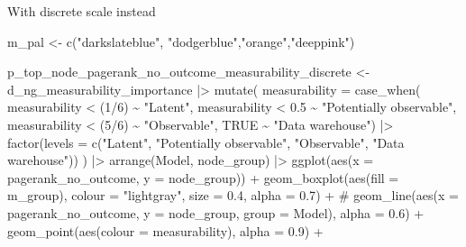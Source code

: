 \documentclass[
  letterpaper,
  DIV=11,
  numbers=noendperiod]{scrartcl}
\newenvironment{Shaded}{\begin{snugshade}}{\end{snugshade}}
\newcommand{\AttributeTok}[1]{\textcolor[rgb]{0.40,0.45,0.13}{#1}}
\newcommand{\CommentTok}[1]{\textcolor[rgb]{0.37,0.37,0.37}{#1}}
\newcommand{\ConstantTok}[1]{\textcolor[rgb]{0.56,0.35,0.01}{#1}}
\newcommand{\DecValTok}[1]{\textcolor[rgb]{0.68,0.00,0.00}{#1}}
\newcommand{\FloatTok}[1]{\textcolor[rgb]{0.68,0.00,0.00}{#1}}
\newcommand{\FunctionTok}[1]{\textcolor[rgb]{0.28,0.35,0.67}{#1}}
\newcommand{\NormalTok}[1]{\textcolor[rgb]{0.00,0.23,0.31}{#1}}
\newcommand{\OtherTok}[1]{\textcolor[rgb]{0.00,0.23,0.31}{#1}}
\newcommand{\SpecialCharTok}[1]{\textcolor[rgb]{0.37,0.37,0.37}{#1}}
\newcommand{\StringTok}[1]{\textcolor[rgb]{0.13,0.47,0.30}{#1}}
\begin{document}
With discrete scale instead

\begin{Shaded}
\begin{Highlighting}[]
\NormalTok{m\_pal }\OtherTok{\textless{}{-}} \FunctionTok{c}\NormalTok{(}\StringTok{"darkslateblue"}\NormalTok{,}
    \StringTok{"dodgerblue"}\NormalTok{,}\StringTok{"orange"}\NormalTok{,}\StringTok{"deeppink"}\NormalTok{)}
    

\NormalTok{p\_top\_node\_pagerank\_no\_outcome\_measurability\_discrete }\OtherTok{\textless{}{-}} 
\NormalTok{    d\_ng\_measurability\_importance }\SpecialCharTok{|\textgreater{}}
    \FunctionTok{mutate}\NormalTok{(}
        \AttributeTok{measurability =} \FunctionTok{case\_when}\NormalTok{(}
\NormalTok{            measurability }\SpecialCharTok{\textless{}}\NormalTok{ (}\DecValTok{1}\SpecialCharTok{/}\DecValTok{6}\NormalTok{) }\SpecialCharTok{\textasciitilde{}} \StringTok{"Latent"}\NormalTok{, }
\NormalTok{            measurability }\SpecialCharTok{\textless{}} \FloatTok{0.5} \SpecialCharTok{\textasciitilde{}} \StringTok{"Potentially observable"}\NormalTok{,}
\NormalTok{            measurability }\SpecialCharTok{\textless{}}\NormalTok{ (}\DecValTok{5}\SpecialCharTok{/}\DecValTok{6}\NormalTok{) }\SpecialCharTok{\textasciitilde{}} \StringTok{"Observable"}\NormalTok{,}
            \ConstantTok{TRUE} \SpecialCharTok{\textasciitilde{}} \StringTok{"Data warehouse"}\NormalTok{) }\SpecialCharTok{|\textgreater{}} 
            \FunctionTok{factor}\NormalTok{(}\AttributeTok{levels =} \FunctionTok{c}\NormalTok{(}\StringTok{"Latent"}\NormalTok{, }\StringTok{"Potentially observable"}\NormalTok{, }\StringTok{"Observable"}\NormalTok{, }\StringTok{"Data warehouse"}\NormalTok{))}
\NormalTok{    ) }\SpecialCharTok{|\textgreater{}} 
    \FunctionTok{arrange}\NormalTok{(Model, node\_group) }\SpecialCharTok{|\textgreater{}}
    \FunctionTok{ggplot}\NormalTok{(}\FunctionTok{aes}\NormalTok{(}\AttributeTok{x =}\NormalTok{ pagerank\_no\_outcome, }\AttributeTok{y =}\NormalTok{ node\_group)) }\SpecialCharTok{+}
    \FunctionTok{geom\_boxplot}\NormalTok{(}\FunctionTok{aes}\NormalTok{(}\AttributeTok{fill =}\NormalTok{ m\_group), }\AttributeTok{colour =} \StringTok{"lightgray"}\NormalTok{, }\AttributeTok{size =} \FloatTok{0.4}\NormalTok{, }\AttributeTok{alpha =} \FloatTok{0.7}\NormalTok{) }\SpecialCharTok{+}
    \CommentTok{\# geom\_line(aes(x = pagerank\_no\_outcome, y = node\_group, group = Model), alpha = 0.6) +}
    \FunctionTok{geom\_point}\NormalTok{(}\FunctionTok{aes}\NormalTok{(}\AttributeTok{colour =}\NormalTok{ measurability), }\AttributeTok{alpha =} \FloatTok{0.9}\NormalTok{) }\SpecialCharTok{+}

\end{Highlighting}
\end{Shaded}
\end{document}
